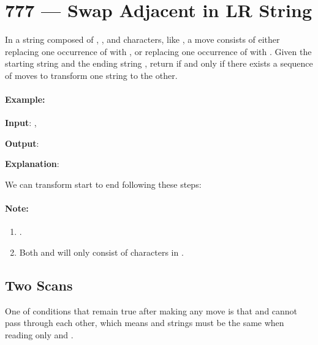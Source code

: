 \section{777 --- Swap Adjacent in LR String}
In a string composed of , , and  characters, like , a move consists of either replacing one occurrence of  with , or replacing one occurrence of  with . Given the starting string  and the ending string , return  if and only if there exists a sequence of moves to transform one string to the other.


\paragraph{Example:}
\begin{flushleft}


\textbf{Input}: , 

\textbf{Output}: 

\textbf{Explanation}:

We can transform start to end following these steps:






\end{flushleft}

\paragraph{Note:}

\begin{enumerate}
\item {}.

\item Both  and  will only consist of characters in \fcj{['L', 'R', 'X']}.
\end{enumerate}

\subsection{Two Scans}
One of conditions that remain true after making any move is that  and  cannot pass through each other, which means  and  strings must be the same when reading only  and .

